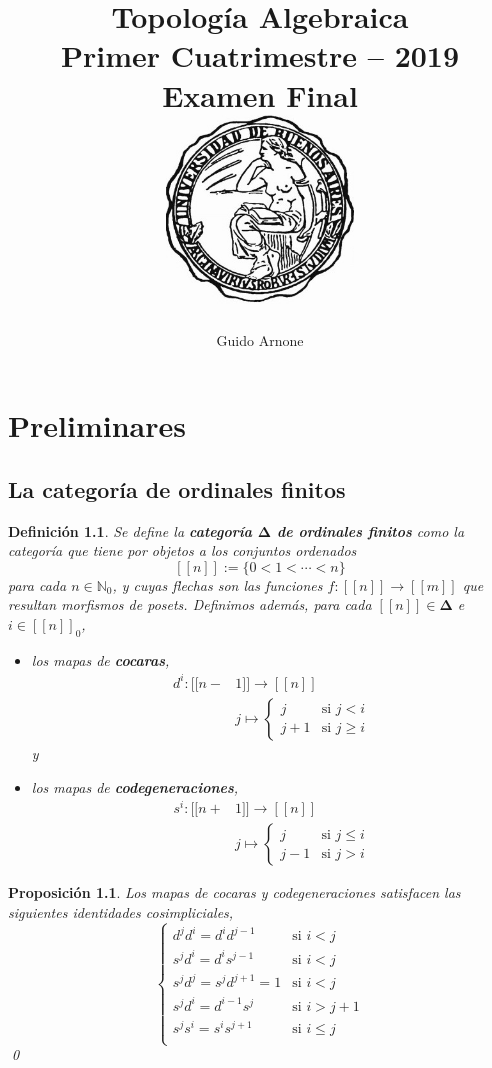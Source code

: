 \documentclass[11pt]{report}
\title{
\LARGE{Topología Algebraica}
\\
\vspace{3pt}
\small{Primer Cuatrimestre -- 2019}
\\
\vspace{0.5pt}
\large{Examen Final}
\\
\vspace{80pt}
{\includegraphics[height=5cm]{uba2.jpg}}
\vspace{80pt}
}
\author{Guido Arnone}
\date{}
\theoremstyle{colored}
\newtheorem{definition}{Definición}[section]
\newtheorem{proposition}{Proposición}[section]
\newcommand{\N}{\mathbb{N}}
\newcommand{\nat}[1]{[\![#1]\!]}
\newcommand{\ord}[1]{\nat{#1}}
\newcommand{\natzero}[1]{\nat{#1}_0}
\newcommand{\ordcat}{\boldsymbol{\Delta}}
\begin{document}
\maketitle
\tableofcontents

\chapter{Preliminares}

\section{La categoría de ordinales finitos}

\begin{definition} Se define la \textbf{categoría $\ordcat$ de ordinales finitos} como la categoría que tiene por objetos a los conjuntos ordenados
\[
\ord{n} := \{0 < 1 < \cdots < n\}
\]
para cada $n \in \N_0$, y cuyas flechas son las funciones $f : \ord{n} \to \ord{m}$ que resultan morfismos de posets. Definimos además, para cada $\ord{n} \in \ordcat$ e $i \in \natzero{n}$, 
\begin{itemize}
\item los mapas de \textbf{cocaras},
\begin{align*}
d^i : \ord{n-&1} \to \ord{n}\\
&j \mapsto \begin{cases}
j &\text{si $j < i$}\\
j+1 &\text{si $j \geq i$}
\end{cases}
\end{align*}
y
\item los mapas de \textbf{codegeneraciones},
\begin{align*}
s^i : \ord{n+&1} \to \ord{n}\\
&j \mapsto \begin{cases}
j &\text{si $j \leq i$}\\
j-1 &\text{si $j > i$}
\end{cases}
\end{align*}
\end{itemize} 
\end{definition}

\begin{proposition} Los mapas de cocaras y codegeneraciones satisfacen las siguientes \textit{identidades cosimpliciales},
\[
\begin{cases}
d^jd^i = d^id^{j-1} &\text{si $i < j$}\\
s^jd^i = d^is^{j-1} &\text{si $i < j$}\\
s^jd^j = s^jd^{j+1} = 1 &\text{si $i < j$}\\
s^jd^i = d^{i-1}s^j &\text{si $i > j+1$}\\
s^js^i = s^is^{j+1} &\text{si $i \leq j$}\\
\end{cases}
\]
\qed \\
\end{proposition}
\end{document}
